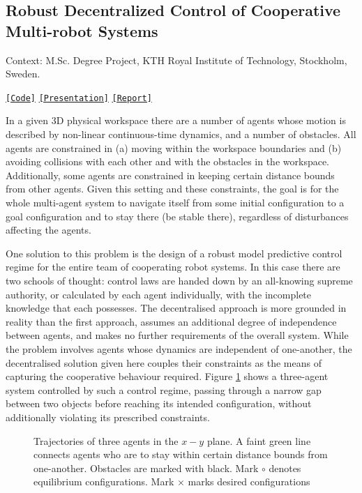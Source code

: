 \subsection{Robust Decentralized Control of Cooperative Multi-robot Systems}

Context: M.Sc. Degree Project, KTH Royal Institute of Technology, Stockholm, Sweden.

\noindent \href{https://github.com/li9i/KTH_thesis_simulations}{\texttt{[Code]}} \href{https://github.com/li9i/KTH_thesis_presentation}{\texttt{[Presentation]}} \href{https://github.com/li9i/KTH_thesis_presentation}{\texttt{[Report]}}

\begin{problem}
In a given 3D physical workspace there are a number of agents whose motion is
described by non-linear continuous-time dynamics, and a number of obstacles.
All agents are constrained in (a) moving within the workspace boundaries and
(b) avoiding collisions with each other and with the obstacles in the
workspace. Additionally, some agents are constrained in keeping certain
distance bounds from other agents. Given this setting and these constraints,
the goal is for the whole multi-agent system to navigate itself from some
initial configuration to a goal configuration and to stay there (be stable
there), regardless of disturbances affecting the agents.
\end{problem}

One solution to this problem is the design of a robust model predictive control
regime for the entire team of cooperating robot systems. In this case there are
two schools of thought: control laws are handed down by an all-knowing supreme
authority, or calculated by each agent individually, with the incomplete
knowledge that each possesses. The decentralised approach is more grounded in
reality than the first approach, assumes an additional degree of independence
between agents, and makes no further requirements of the overall system. While
the problem involves agents whose dynamics are independent of one-another, the
decentralised solution given here couples their constraints as the means of
capturing the cooperative behaviour required.  Figure
\ref{fig:d_OFF_res_trajectory_3_2} shows a three-agent system controlled by
such a control regime, passing through a narrow gap between two objects before
reaching its intended configuration, without additionally violating its
prescribed constraints.

\begin{figure}[H]\centering
  \scalebox{0.8}{}
  \caption{\small Trajectories of three agents in the $x-y$ plane. A faint
           green line connects agents who are to stay within certain distance
           bounds from one-another. Obstacles are marked with black. Mark
           $\circ$ denotes equilibrium configurations. Mark $\times$ marks
           desired configurations}
  \label{fig:d_OFF_res_trajectory_3_2}
\end{figure}

